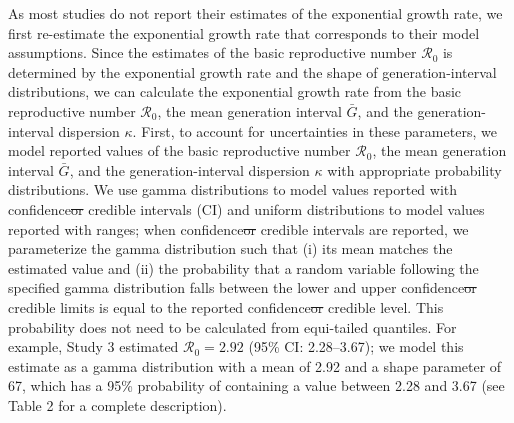 \documentclass[12pt]{article}
\newcommand{\Ro}{\ensuremath{{\mathcal R}_{0}}\xspace}
\providecommand{\DIFaddtex}[1]{{\protect\color{blue}\uwave{#1}}} %
\providecommand{\DIFdeltex}[1]{{\protect\color{red}\sout{#1}}}                      %
\providecommand{\DIFaddbegin}{} %
\providecommand{\DIFaddend}{} %
\providecommand{\DIFdelbegin}{} %
\providecommand{\DIFdelend}{} %
\providecommand{\DIFadd}[1]{\texorpdfstring{\DIFaddtex{#1}}{#1}} %
\providecommand{\DIFdel}[1]{\texorpdfstring{\DIFdeltex{#1}}{}} %
\newcommand{\DIFscaledelfig}{0.5}
\newlength{\DIFdelgraphicswidth} %
\newlength{\DIFdelgraphicsheight} %
\newcommand{\DIFaddincludegraphics}[2][]{{\color{blue}\fbox{\DIFOincludegraphics[#1]{#2}}}} %
\newcommand{\DIFdelincludegraphics}[2][]{%
\sbox{\DIFdelgraphicsbox}{\DIFOincludegraphics[#1]{#2}}%
\settoboxwidth{\DIFdelgraphicswidth}{\DIFdelgraphicsbox} %
\settoboxtotalheight{\DIFdelgraphicsheight}{\DIFdelgraphicsbox} %
\scalebox{\DIFscaledelfig}{%
\parbox[b]{\DIFdelgraphicswidth}{\usebox{\DIFdelgraphicsbox}\\[-\baselineskip] \rule{\DIFdelgraphicswidth}{0em}}\llap{\resizebox{\DIFdelgraphicswidth}{\DIFdelgraphicsheight}{%
\setlength{\unitlength}{\DIFdelgraphicswidth}%
\begin{picture}(1,1)%
\thicklines\linethickness{2pt} %
{\color[rgb]{1,0,0}\put(0,0){\framebox(1,1){}}}%
{\color[rgb]{1,0,0}\put(0,0){\line( 1,1){1}}}%
{\color[rgb]{1,0,0}\put(0,1){\line(1,-1){1}}}%
\end{picture}%
}\hspace*{3pt}}} %
} %
\DeclareRobustCommand{\DIFaddbegin}{\DIFOaddbegin \let\includegraphics\DIFaddincludegraphics} %
\DeclareRobustCommand{\DIFaddend}{\DIFOaddend \let\includegraphics\DIFOincludegraphics} %
\DeclareRobustCommand{\DIFdelbegin}{\DIFOdelbegin \let\includegraphics\DIFdelincludegraphics} %
\DeclareRobustCommand{\DIFdelend}{\DIFOaddend \let\includegraphics\DIFOincludegraphics} %
\begin{document}
As most studies do not report their estimates of the exponential growth rate, we first re-estimate the exponential growth rate that corresponds to their model assumptions.
Since the estimates of the basic reproductive number \Ro is determined by the exponential growth rate and the shape of generation-interval distributions, we can calculate the exponential growth rate from the basic reproductive number \Ro, the mean generation interval $\bar G$, and the generation-interval dispersion $\kappa$.
First, to account for uncertainties in these parameters, we model reported values of the basic reproductive number \Ro, the mean generation interval $\bar G$, and the generation-interval dispersion $\kappa$ with appropriate probability distributions.
We use gamma distributions to model values reported with confidence\DIFdelbegin \DIFdel{or }\DIFdelend \DIFaddbegin \DIFadd{/}\DIFaddend credible intervals (CI) and uniform distributions to model values reported with ranges;
when confidence\DIFdelbegin \DIFdel{or }\DIFdelend \DIFaddbegin \DIFadd{/}\DIFaddend credible intervals are reported, we parameterize the gamma distribution such that (i) its mean matches the estimated value and (ii) the probability that a random variable following the specified gamma distribution falls between the lower and upper confidence\DIFdelbegin \DIFdel{or }\DIFdelend \DIFaddbegin \DIFadd{/}\DIFaddend credible limits is equal to the reported confidence\DIFdelbegin \DIFdel{or }\DIFdelend \DIFaddbegin \DIFadd{/}\DIFaddend credible level. 
This probability does not need to be calculated from equi-tailed quantiles.
For example, Study 3 estimated $\Ro = 2.92$ (95\% CI: 2.28--3.67);
we model this estimate as a gamma distribution with a mean of 2.92 and a shape parameter of 67, which has a 95\% probability of containing a value between 2.28 and 3.67 (see Table 2 for a complete description).
\end{document}
